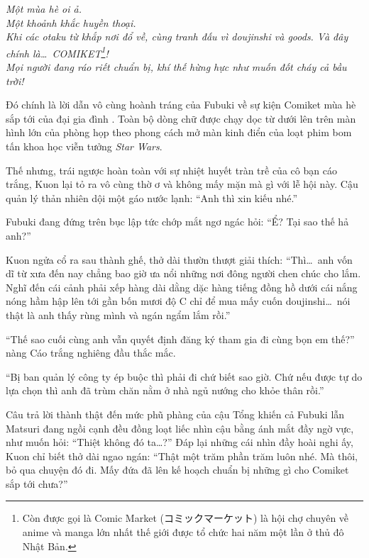 \documentclass[../main.tex]{subfiles}
\begin{document}
\color{black}
\begin{center}
  \textit{Một mùa hè oi ả. \\
    Một khoảnh khắc huyền thoại. \\
    Khi các otaku từ khắp nơi đổ về, cùng tranh đấu vì doujinshi và goods. Và đây chính là\dots\ COMIKET\footnote{Còn được gọi là Comic Market (コミックマーケット) là hội chợ chuyên về anime và manga lớn nhất thế giới được tổ chức hai năm một lần ở thủ đô Nhật Bản.}! \\
    Mọi người đang ráo riết chuẩn bị, khí thế hừng hực như muốn đốt cháy cả bầu trời!}
\end{center}

Đó chính là lời dẫn vô cùng hoành tráng của Fubuki về sự kiện Comiket mùa hè sắp tới của đại gia đình \hll. Toàn bộ dòng chữ được chạy dọc từ dưới lên trên màn hình lớn của phòng họp theo phong cách mở màn kinh điển của loạt phim bom tấn khoa học viễn tưởng \textit{Star Wars}.

Thế nhưng, trái ngược hoàn toàn với sự nhiệt huyết tràn trề của cô bạn cáo trắng, Kuon lại tỏ ra vô cùng thờ ơ và không mấy mặn mà gì với lễ hội này. Cậu quản lý thản nhiên dội một gáo nước lạnh: ``Anh thì xin kiếu nhé.''

Fubuki đang đứng trên bục lập tức chớp mắt ngơ ngác hỏi:
``Ể? Tại sao thế hả anh?''

Kuon ngửa cổ ra sau thành ghế, thở dài thườn thượt giải thích:
``Thì\dots\ anh vốn dĩ từ xưa đến nay chẳng bao giờ ưa nổi những nơi đông người chen chúc cho lắm. Nghĩ đến cái cảnh phải xếp hàng dài dằng dặc hàng tiếng đồng hồ dưới cái nắng nóng hầm hập lên tới gần bốn mươi độ C chỉ để mua mấy cuốn doujinshi\dots\ nói thật là anh thấy rùng mình và ngán ngẩm lắm rồi.''

``Thế sao cuối cùng anh vẫn quyết định đăng ký tham gia đi cùng bọn em thế?'' nàng Cáo trắng nghiêng đầu thắc mắc.

``Bị ban quản lý công ty ép buộc thì phải đi chứ biết sao giờ. Chứ nếu được tự do lựa chọn thì anh đã trùm chăn nằm ở nhà ngủ nướng cho khỏe thân rồi.''

Câu trả lời thành thật đến mức phũ phàng của cậu Tổng khiến cả Fubuki lẫn Matsuri đang ngồi cạnh đều đồng loạt liếc nhìn cậu bằng ánh mắt đầy ngờ vực, như muốn hỏi: ``Thiệt không đó ta\dots?'' Đáp lại những cái nhìn đầy hoài nghi ấy, Kuon chỉ biết thở dài ngao ngán:
``Thật một trăm phần trăm luôn nhé. Mà thôi, bỏ qua chuyện đó đi. Mấy đứa đã lên kế hoạch chuẩn bị những gì cho Comiket sắp tới chưa?''
\end{document}
